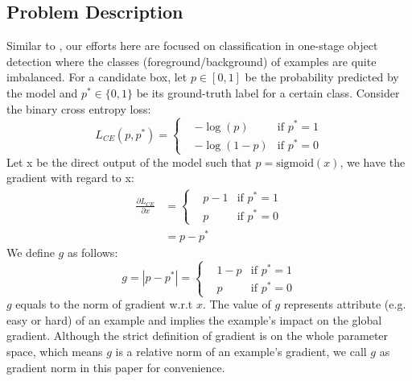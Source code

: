 \documentclass[letterpaper]{article} %
\begin{document}
\subsection{Problem Description}
Similar to \cite{focal}, our efforts here are focused on classification in one-stage object detection where the classes (foreground/background) of examples are quite imbalanced. For a candidate box, let $p \in [0,1]$ be the probability predicted by the model and $p^* \in \{0,1\}$ be its ground-truth label for a certain class. Consider the binary cross entropy loss: 
\begin{equation}
\label{eq:ce}
  L_{CE}(p,p^*) = \left\{
    \begin{aligned}
    & -\log(p)  & \text{if } p^* = 1 \\
    & -\log(1-p) & \text{if } p^* = 0 
    \end{aligned}
  \right.
\end{equation}
Let x be the direct output of the model such that $p = \text{sigmoid}(x)$, we have the gradient with regard to x:
\begin{equation}
\begin{aligned}
\frac{\partial L_{CE}}{\partial x} &= \left\{
    \begin{aligned}
    & p - 1  & \text{if } p^* = 1 \\
    & p & \text{if } p^* = 0 
    \end{aligned} 
    \right. \\
    &= p - p^*
\end{aligned}
\end{equation}
We define $g$ as follows:
\begin{equation}
    g = |p - p^*| = \left\{
    \begin{aligned}
    & 1 - p  & \text{if } p^* = 1 \\
    & p & \text{if } p^* = 0 
    \end{aligned}
    \right.
\end{equation}
$g$ equals to the norm of gradient w.r.t $x$. The value of $g$ represents attribute (e.g. easy or hard) of an example and implies the example's impact on the global gradient. Although the strict definition of gradient is on the whole parameter space, which means $g$ is a relative norm of an example's gradient, we call $g$ as gradient norm in this paper for convenience.
\end{document}
